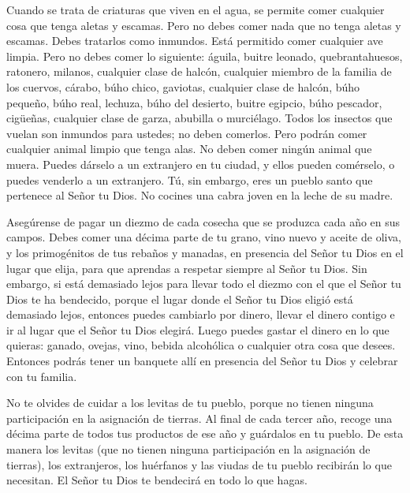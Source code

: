  Cuando se trata de criaturas que viven en el agua, se
permite comer cualquier cosa que tenga aletas y escamas. 
Pero no debes comer nada que no tenga aletas y escamas. Debes tratarlos
como inmundos.  Está permitido comer cualquier ave limpia.
 Pero no debes comer lo siguiente: águila, buitre leonado,
quebrantahuesos,  ratonero, milanos, cualquier clase de
halcón,  cualquier miembro de la familia de los cuervos,
 cárabo, búho chico, gaviotas, cualquier clase de halcón,
 búho pequeño, búho real, lechuza,  búho del
desierto, buitre egipcio, búho pescador,  cigüeñas,
cualquier clase de garza, abubilla o murciélago.  Todos los
insectos que vuelan son inmundos para ustedes; no deben comerlos.
 Pero podrán comer cualquier animal limpio que tenga alas.
 No deben comer ningún animal que muera. Puedes dárselo a
un extranjero en tu ciudad, y ellos pueden comérselo, o puedes venderlo
a un extranjero. Tú, sin embargo, eres un pueblo santo que pertenece al
Señor tu Dios. No cocines una cabra joven en la leche de su madre.

 Asegúrense de pagar un diezmo de cada cosecha que se
produzca cada año en sus campos.  Debes comer una décima
parte de tu grano, vino nuevo y aceite de oliva, y los primogénitos de
tus rebaños y manadas, en presencia del Señor tu Dios en el lugar que
elija, para que aprendas a respetar siempre al Señor tu Dios.
 Sin embargo, si está demasiado lejos para llevar todo el
diezmo con el que el Señor tu Dios te ha bendecido, porque el lugar
donde el Señor tu Dios eligió está demasiado lejos, 
entonces puedes cambiarlo por dinero, llevar el dinero contigo e ir al
lugar que el Señor tu Dios elegirá.  Luego puedes gastar el
dinero en lo que quieras: ganado, ovejas, vino, bebida alcohólica o
cualquier otra cosa que desees. Entonces podrás tener un banquete allí
en presencia del Señor tu Dios y celebrar con tu familia.

 No te olvides de cuidar a los levitas de tu pueblo, porque
no tienen ninguna participación en la asignación de tierras.
 Al final de cada tercer año, recoge una décima parte de
todos tus productos de ese año y guárdalos en tu pueblo. 
De esta manera los levitas (que no tienen ninguna participación en la
asignación de tierras), los extranjeros, los huérfanos y las viudas de
tu pueblo recibirán lo que necesitan. El Señor tu Dios te bendecirá en
todo lo que hagas.

